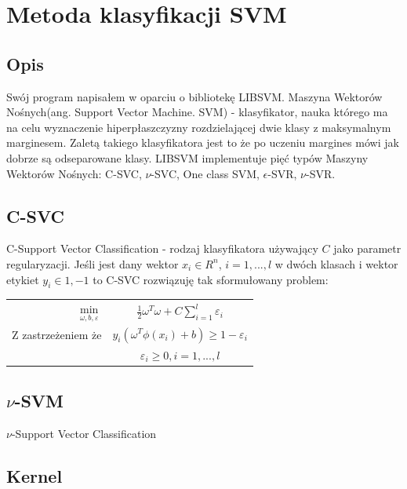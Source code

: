 \documentclass[paper=a4, fontsize=11pt]{scrartcl} %
\numberwithin{equation}{section} %
\numberwithin{figure}{section} %
\begin{document}
\section{Metoda klasyfikacji SVM} %
\subsection{Opis}
    \par Swój program napisałem w oparciu o bibliotekę LIBSVM\cite{CC01a}. Maszyna Wektorów
    Nośnych(ang. Support Vector Machine. SVM) - klasyfikator, nauka którego ma na celu 
    wyznaczenie hiperpłaszczyzny rozdzielającej dwie klasy z maksymalnym marginesem. 
    Zaletą takiego klasyfikatora jest to że po uczeniu margines mówi jak dobrze są 
    odseparowane klasy. LIBSVM implementuje pięć typów Maszyny Wektorów Nośnych: C-SVC, 
    $\nu$-SVC, One class SVM, $\epsilon$-SVR, $\nu$-SVR.
\subsection{C-SVC}
    \par C-Support Vector Classification - rodzaj klasyfikatora używający $C$ jako 
    parametr regularyzacji. Jeśli jest dany wektor $x_i \in R^n$, $i=1,...,l$ %
    w dwóch klasach i wektor etykiet $y_i \in {1, -1}$ to C-SVC rozwiązuję tak
    sformułowany problem:

    \begin{center}
        \begin{tabular}{rc}
            $\min\limits_{\omega, b, \varepsilon}$ & $\frac{1}{2} \omega ^T \omega +
            C \sum\limits_{i=1}^{l}\varepsilon_i$ \\
            Z zastrzeżeniem że & $y_i(\omega^T\phi(x_i) + b) \geq 1 - \varepsilon_i$ \\
                               & $\varepsilon_i \geq 0,i=1,...,l$
        \end{tabular}
    \end{center}

\subsection{$\nu$-SVM}
    \par $\nu$-Support Vector Classification  %
\subsection{Kernel}
\newpage
\end{document}
